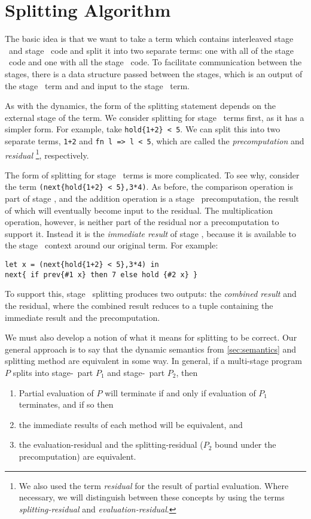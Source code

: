 
\section{Splitting Algorithm}

The basic idea is that we want to take a term which contains interleaved stage \bbone\ and stage \bbtwo\ code
and split it into two separate terms: one with all of the stage \bbone\ code and one with all the stage \bbtwo\ code.
To facilitate communication between the stages, there is a data structure passed between the stages, 
which is an output of the stage \bbone\ term and and input to the stage \bbtwo\ term.

As with the dynamics, the form of the splitting statement depends on the external stage of the term.
We consider splitting for stage \bbtwo\ terms first, as it has a simpler form.  
For example, take \verb|hold{1+2} < 5|.
We can split this into two separate terms, \verb|1+2| and \verb|fn l => l < 5|, 
which are called the {\em precomputation} and {\em residual}
\footnote{We also used the term {\em residual} for the result of partial evaluation.
Where necessary, we will distinguish between these concepts by using the terms {\em splitting-residual}
and {\em evaluation-residual}.}, respectively.  

The form of splitting for stage \bbone\ terms is more complicated.
To see why, consider the term \verb|(next{hold{1+2} < 5},3*4)|.
As before, the comparison operation is part of stage \bbtwo, 
and the addition operation is a stage \bbone\ precomputation, the result of which will eventually become input to the residual.
The multiplication operation, however, is neither part of the residual nor a precomputation to support it.
Instead it is the {\em immediate result} of stage \bbone, 
because it is available to the stage \bbone\ context around our original term.
For example:
\begin{lstlisting}
let x = (next{hold{1+2} < 5},3*4) in
next{ if prev{#1 x} then 7 else hold {#2 x} }
\end{lstlisting}
To support this, stage \bbone\ splitting produces two outputs: the {\em combined result} and the residual,
where the combined result reduces to a tuple containing the immediate result and the precomputation.

We must also develop a notion of what it means for splitting to be correct.  
Our general approach is to say that the dynamic semantics from \ref{sec:semantics} and splitting method are equivalent in some way.  
In general, if a multi-stage program $P$ splits into stage-\bbone\ part $P_1$ and stage-\bbtwo\ part $P_2$, then
\begin{enumerate}
\item Partial evaluation of $P$ will terminate if and only if evaluation of $P_1$ terminates, and if so then
\item the immediate results of each method will be equivalent, and
\item the evaluation-residual and the splitting-residual ($P_2$ bound under the precomputation) are equivalent.
\end{enumerate}

